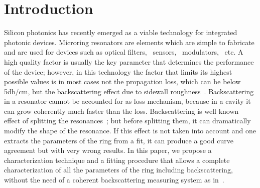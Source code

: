 \documentclass[conference,letterpaper,final]{IEEEtran}
\begin{document}
\section{Introduction}
Silicon photonics has recently emerged as a viable technology for integrated photonic devices. Microring resonators are elements which are simple to fabricate and are used for devices such as optical filters,~\cite{BLittle98} sensors,~\cite{KVos07} modulators,~\cite{Almeida04} etc. A high quality factor is usually the key parameter that determines the performance of the device; however, in this technology the factor that limits its highest possible values is in most cases not the propagation loss, which can be below 5db/cm, but the backscattering effect due to sidewall roughness~\cite{Morichetti10}. Backscattering in a resonator cannot be accounted for as loss mechanism, because in a cavity it can grow coherently much faster than the loss. Backscattering is well known effect of splitting the resonances~\cite{BLittle97}; but before splitting them, it can dramatically modify the shape of the resonance. If this effect is not taken into account and one extracts the parameters of the ring from a fit, it can produce a good curve agreement but with very wrong results. In this paper, we propose a characterization technique and a fitting procedure that allows a complete characterization of all the parameters of the ring including backscattering, without the need of a coherent backscattering measuring system as in~\cite{Morichetti10,Morichetti2010}.
\end{document}
